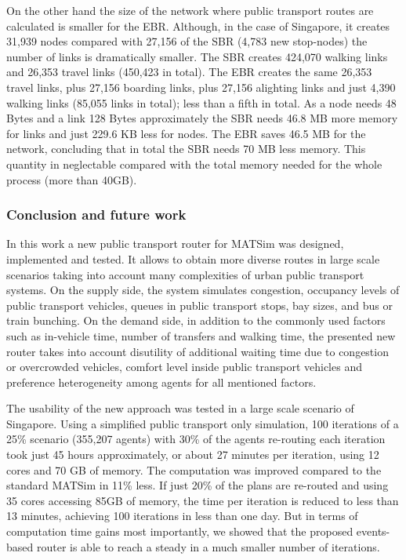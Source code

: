 On the other hand the size of the network where public transport routes are calculated is smaller for the EBR. Although, in the case of Singapore, it creates 31,939 nodes compared with 27,156 of the SBR (4,783 new stop-nodes) the number of links is dramatically smaller. The SBR creates 424,070 walking links and 26,353 travel links (450,423 in total). The EBR creates the same 26,353 travel links, plus 27,156 boarding links, plus 27,156 alighting links and just 4,390 walking links (85,055 links in total); less than a fifth in total. As a node needs 48 Bytes and a link 128 Bytes approximately the SBR needs 46.8 MB more memory for links and just 229.6 KB less for nodes. The EBR saves 46.5 MB for the network, concluding that in total the SBR needs 70 MB less memory. This quantity in neglectable compared with the total memory needed for the whole process (more than 40GB).

\subsubsection{Conclusion and future work} \label{sec:ConclusionsAndOutlook}

In this work a new public transport router for MATSim was designed, implemented and tested. It allows to obtain more diverse routes in large scale scenarios taking into account many complexities of urban public transport systems. On the supply side, the system simulates congestion, occupancy levels of public transport vehicles, queues in public transport stops, bay sizes, and bus or train bunching. On the demand side, in addition to the commonly used factors such as in-vehicle time, number of transfers and walking time, the presented new router takes into account disutility of additional waiting time due to congestion or overcrowded vehicles, comfort level inside public transport vehicles and preference heterogeneity among agents for all mentioned factors.

The usability of the new approach was tested in a large scale scenario of Singapore. Using a simplified public transport only simulation, 100 iterations of a 25\% scenario (355,207 agents) with 30\% of the agents re-routing each iteration took just 45 hours approximately, or about 27 minutes per iteration, using 12 cores and 70 GB of memory. The computation was improved compared to the standard MATSim in 11\% less. If just 20\% of the plans are re-routed and using 35 cores accessing 85GB of memory, the time per iteration is reduced to less than 13 minutes, achieving 100 iterations in less than one day. But in terms of computation time gains most importantly, we showed that the proposed events-based router is able to reach a steady in a much smaller number of iterations.

